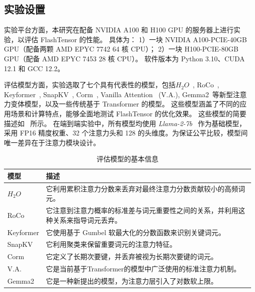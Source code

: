 \subsection{实验设置}
实验平台方面，本研究在配备 NVIDIA A100 和 H100 GPU 的服务器上进行实验，以评估 FlashTensor 的性能。
具体为：
1）一块 NVIDIA A100-PCIE-40GB GPU（配备两颗 AMD EPYC 7742 64 核 CPU）；
2）一块 H100-PCIE-80GB GPU（配备 AMD EPYC 7453 28 核 CPU）。
软件版本为 Python 3.10、CUDA 12.1 和 GCC 12.2。

评估模型方面，实验选取了七个具有代表性的模型，包括\(H_{2}O\)~\cite{zhang2024h2o}, RoCo~\cite{ren2024roco}, Keyformer~\cite{adnan2024keyformer}, SnapKV~\cite{li2024snapkv}, Corm~\cite{dai2024corm}, Vanilla Attention~\cite{vaswani2017attention} (V.A.), Gemma2~\cite{team2024gemma2}等新型注意力变体模型，以及一些传统基于 Transformer 的模型。
这些模型涵盖了不同的应用场景和计算特点，能够全面地测试 FlashTensor 的优化效果。
这些模型的简要描述如~ 所示。
在端到端实验中，所有模型均使用 \textit {Llama-2-7b}~\cite {touvron2023llama2} 作为基础模型，采用 FP16 精度权重、32 个注意力头和 128 的头维度。为保证公平比较，模型间唯一差异在于注意力模块设计。


\begin{table}[ht]
    \centering
    \caption{评估模型的基本信息}
    \begin{tabular}{lp{12cm}}
       \toprule
       模型   & 描述 \\
       \hline
       \(H_{2}O\)   & 它利用累积注意力分数来丢弃对最终注意力分数贡献较小的高频词元。 \\
       RoCo   & 它注意到注意力概率的标准差与词元重要性之间的关系，并利用这种关系来指导词元丢弃。 \\
       Keyformer  & 它使用基于 Gumbel 软最大化的分数函数来识别关键词元。 \\
       SnapKV   & 它利用聚类来保留重要词元的注意力特征。 \\
       Corm   & 它定义了长期次要键，并丢弃被视为长期次要键的词元。 \\
       V.A.   & 它是当前基于Transformer的模型中广泛使用的标准注意力机制。 \\
       Gemma2   & 它是一种新提出的模型，为注意力层引入了对数软上限。 \\
       \bottomrule
    \end{tabular}
    \label{tab:model_description}
\end{table}

